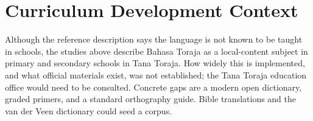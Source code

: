 \documentclass[12pt]{article}
\begin{document}
\section{Curriculum Development Context}
Although the reference description says the language is not known to be taught in schools, the studies above describe Bahasa Toraja as a local-content subject in primary and secondary schools in Tana Toraja. How widely this is implemented, and what official materials exist, was not established; the Tana Toraja education office would need to be consulted. Concrete gaps are a modern open dictionary, graded primers, and a standard orthography guide. Bible translations and the van der Veen dictionary could seed a corpus.
\end{document}
